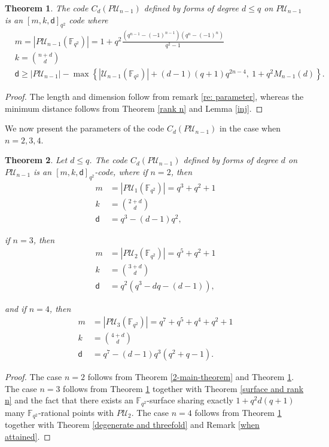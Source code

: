 \documentclass[10pt,a4paper,oneside]{amsproc}
\newtheorem{theorem}{Theorem}[section]
\newcommand{\Fqt}{\mathbb{F}_{q^2}}
\newcommand{\U}{\mathcal{U}}
\begin{document}
\begin{theorem}\label{th:parameters}
    The code $C_d(P\U_{n-1})$ defined by forms of degree $d\leq q$ on $P\U_{n-1}$ is an $[m,k,\mathsf{d}]_{q^2}$ code where 
    \begin{align*}
        &m=|P\U_{n-1}(\Fqt)|=1+q^2\frac{(q^{n-1}-(-1)^{n-1})(q^n-(-1)^n)}{q^2-1}\\
        &k=\binom{n+d}{d}\\
        & \mathsf{d}\geq |P\U_{n-1}|- \max \left\{|\U_{n-1}(\Fqt)|+(d-1)(q+1)q^{2n-4}, \ 1+q^2 M_{n-1}(d) \right\}. 
    \end{align*}
\end{theorem}
\begin{proof}
  The length and dimension follow from remark \ref{re: parameter}, whereas the minimum distance follows from Theorem \ref{rank n} and Lemma \ref{inj}.  
\end{proof}

We now present the parameters of the code $C_d(P\U_{n-1})$ in the case when $n=2,3,4$.
\begin{theorem}\label{codes PU}
Let $d\le q$. The code $C_d(P\U_{n-1})$ defined by forms of degree $d$ on $P\U_{n-1}$ is an $[m,k,\mathsf{d}]_{q^2}$-code, where if $n=2$, then
\begin{align*}
m &= |P\U_{1}(\Fqt)| = q^3 + q^2 + 1\\
k &= \binom{2+d}{d}\\
\mathsf{d} &= q^3-(d-1)q^2,
\end{align*}


 if $n=3$, then
\begin{align*}
m &= |P\U_{2}(\Fqt)| = q^5 + q^2 + 1\\
k &= \binom{3+d}{d}\\
\mathsf{d} &= q^2\left(q^3 - dq - (d-1)\right),
\end{align*}

and if $n=4$, then
\begin{align*}
m &= |P\U_{3}(\Fqt)| = q^7 + q^5 + q^4 + q^2 + 1\\
k &= \binom{4+d}{d}\\
\mathsf{d} &= q^7 - (d-1)q^3(q^2+q-1).
\end{align*}
\end{theorem}

\begin{proof} 
The case $n=2$ follows from Theorem \ref{2-main-theorem} and Theorem \ref{th:parameters}.
The case $n=3$ follows from Theorem \ref{th:parameters} together with Theorem \ref{surface and rank n} and the fact that there exists an $\Fqt$-surface sharing exactly $1+q^2d(q+1)$ many $\Fqt$-rational points with $P\U_2$. 
The case $n=4$ follows from Theorem \ref{th:parameters} together with Theorem \ref{degenerate and threefold} and Remark \ref{when attained}.
\end{proof}
\end{document}
